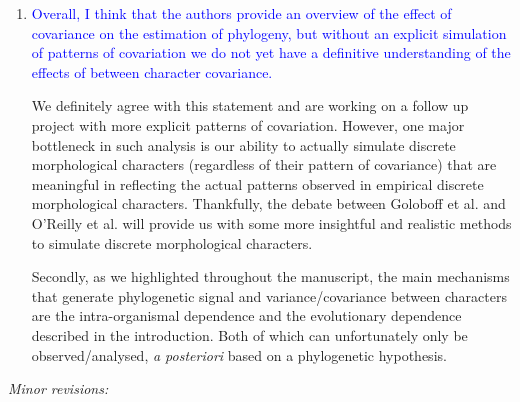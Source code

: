\documentclass[12pt,letterpaper]{article}
\renewcommand{\subsection}[1]{%
\bigskip
\begin{center}
\begin{large}
\normalfont\itshape #1
\end{large}
\end{center}}
\begin{document}
\begin{enumerate}
\item{\textcolor{blue}{Overall, I think that the authors provide an overview of the effect of covariance on the estimation of phylogeny, but without an explicit simulation of patterns of covariation we do not yet have a definitive understanding of the effects of between character covariance.}}

We definitely agree with this statement and are working on a follow up project with more explicit patterns of covariation.
However, one major bottleneck in such analysis is our ability to actually simulate discrete morphological characters (regardless of their pattern of covariance) that are meaningful in reflecting the actual patterns observed in empirical discrete morphological characters.
Thankfully, the debate between Goloboff et al. and O'Reilly et al. will provide us with some more insightful and realistic methods to simulate discrete morphological characters.

Secondly, as we highlighted throughout the manuscript, the main mechanisms that generate phylogenetic signal and variance/covariance between characters are the intra-organismal dependence and the evolutionary dependence described in the introduction.
Both of which can unfortunately only be observed/analysed, \textit{a posteriori} based on a phylogenetic hypothesis.


\end{enumerate}

\subsection{Minor revisions:}
\end{document}
